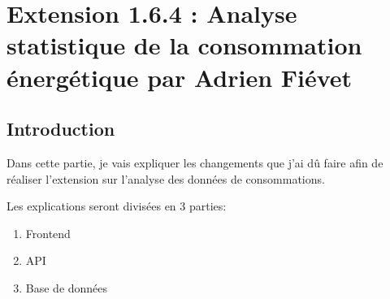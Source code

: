 \section{Extension 1.6.4 : Analyse statistique de la
consommation énergétique par Adrien Fiévet}
\subsection{Introduction}

\begin{flushleft}
Dans cette partie, je vais expliquer les changements que j'ai dû faire afin de réaliser l'extension sur l'analyse des données de consommations.
\end{flushleft} 

\begin{flushleft}
Les explications seront divisées en 3 parties:
\end{flushleft} 

\begin{enumerate}
    \item Frontend
    \item API
    \item Base de données
\end{enumerate}
